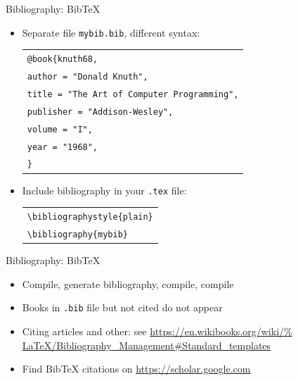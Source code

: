 \documentclass[11pt]{beamer}
\newcommand{\bs}{\textbackslash}
\begin{document}
\begin{frame}{Bibliography: BibTeX}
  \begin{itemize}
    \item Separate file \texttt{mybib.bib}, different syntax:

          \begin{center}\begin{tabular}{l}
            \texttt{@book\{knuth68,} \\
            \texttt{\qquad author    = "Donald Knuth",}\\
            \texttt{\qquad title     = "The Art of Computer Programming",}\\
            \texttt{\qquad publisher = "Addison-Wesley",}\\
            \texttt{\qquad volume    = "I",}\\
            \texttt{\qquad year      = "1968",} \\
            \texttt{\}}
          \end{tabular}\end{center}

    \vspace{0.3cm}
    \item Include bibliography in your \texttt{.tex} file:

          \begin{center}\begin{tabular}{l}
            \texttt{\bs bibliographystyle\{plain\}}\\
            \texttt{\bs bibliography\{mybib\}}
          \end{tabular}\end{center}
  \end{itemize}
\end{frame}


\begin{frame}{Bibliography: BibTeX}
  \begin{itemize}
    \item Compile, generate bibliography, compile, compile

    \vspace{0.3cm}
    \item Books in \texttt{.bib} file but not cited do not appear

    \vspace{0.3cm}
    \item Citing articles and other: see \url{https://en.wikibooks.org/wiki/%
          LaTeX/Bibliography\_Management\#Standard\_templates}

    \vspace{0.3cm}
    \item Find BibTeX citations on \url{https://scholar.google.com}
  \end{itemize}
\end{frame}
\end{document}
